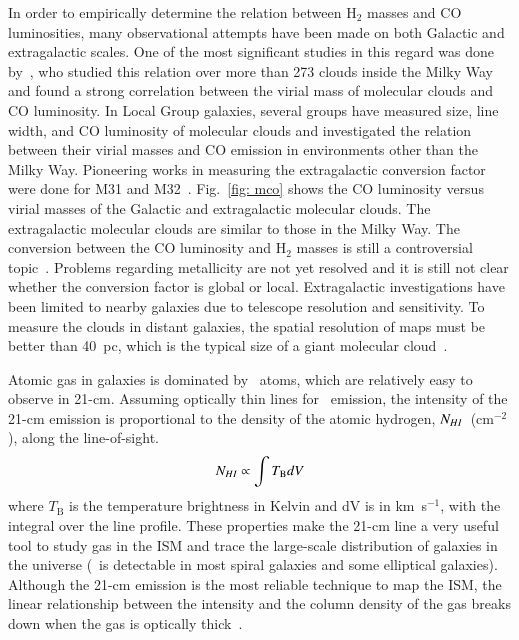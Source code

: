 In order to empirically determine the relation between H$_2$ masses and CO luminosities, many observational attempts have been made on both Galactic and extragalactic scales. 
One of the most significant studies in this regard was done by~\cite{Solomon87}, who studied this relation over more than 273 clouds inside the Milky Way and found a strong correlation between the virial mass of molecular clouds and CO luminosity. 
In Local Group galaxies, several groups have measured size, line width, and CO luminosity of molecular clouds and investigated the relation between  their virial masses and CO emission in environments other than the Milky Way. 
Pioneering works in measuring the extragalactic conversion factor were done for M31 and M32~\citep[e.g.,][]{Wilson89, Wilson90}. 
Fig.~\ref{fig: mco} shows the CO luminosity versus virial masses of the Galactic and extragalactic molecular clouds. 
The extragalactic molecular clouds are similar to those in the Milky Way. 
The conversion between the CO luminosity and H$_2$ masses is still a controversial topic~\citep[e.g.][]{Narayanan11, Bolato13, Sandstrom13}.
Problems regarding metallicity are not yet resolved and it is still not clear whether the conversion factor is global or local. 
Extragalactic investigations have been limited to nearby galaxies due to telescope resolution and sensitivity. 
To measure the clouds in distant galaxies, the spatial resolution of maps must be better than 40~pc, which is the typical size of a giant molecular cloud~\citep[e.g.][and references therein]{Young91,Bolato13}. 

Atomic gas in galaxies is dominated by \hi~atoms, which are relatively easy to observe in 21-cm.
Assuming optically thin lines for \hi~emission, the intensity of the 21-cm emission is proportional to the density of the atomic hydrogen, $N_{H {\sc I}}$~(cm$^{-2}$), along the line-of-sight.
\begin{equation}
N_{H {\sc I}}  \propto \int T_{\mathrm B} dV
\end{equation}
where $T_{\mathrm B}$ is the temperature brightness in Kelvin and dV is in km~s$^{-1}$, with the integral over the line profile. 
These properties make the 21-cm line a very useful tool to study gas in the ISM and trace the large-scale distribution of galaxies in the universe (\hi~is detectable in most spiral galaxies and some elliptical galaxies).
Although the 21-cm emission is the most reliable technique to map the ISM, the linear relationship between the intensity and the column density of the gas breaks down when the gas is optically thick~\citep{Braun09}. 

